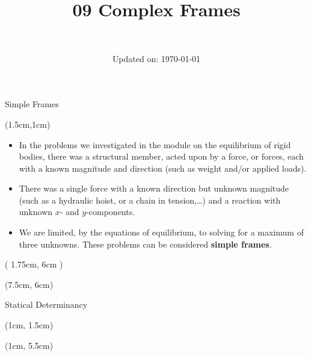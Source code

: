 \documentclass[9pt, xcolor={svgnames, x11names},professionalfonts]{beamer}
\title[09 Complex Frames]{\Huge 09 Complex Frames}
\subtitle[Engineering Statics]{\Large\textcolor{white}{Engineering Statics}}
\author{}
\date{\small Updated on: \today}
\def\scale{1}
\begin{document}

\begin{frame}[plain]    %
	\titlepage
\end{frame}

%
\begin{frame}{Simple Frames}
 	\begin{textblock*}{10cm}(1.5cm,1cm)
  	\begin{itemize}
			\item  In the problems we investigated in the module on the equilibrium of rigid bodies, there was  a structural member, acted upon by a force, or forces, each with a known magnitude and direction (such as weight and/or applied loads). \parm
			\item There was a single force with a known direction but unknown magnitude (such as a hydraulic hoist, or a chain in tension,\ldots) and a reaction with unknown $x$- and $y$-components.\parm
			\item We are limited, by the equations of equilibrium, to solving for a maximum of three unknowns. These problems can be considered {\bf simple frames}.
  	\end{itemize}
 	\end{textblock*}

 \def\scale{0.45}
 \begin{textblock*}{4cm}( 1.75cm, 6cm )	
  	
 \end{textblock*}
 \def\scale{0.325}
 \begin{textblock*}{4cm}(7.5cm, 6cm)
  
 \end{textblock*}

\end{frame}
\begin{frame}{Statical Determinancy}
 \begin{textblock*}{1\textwidth}(1cm, 1.5cm)
  \centering
  \def\scale{0.625}
  
 \end{textblock*}

 \begin{textblock*}{1\textwidth}(1cm, 5.5cm)
  
 \end{textblock*}

\end{frame}
\end{document}
